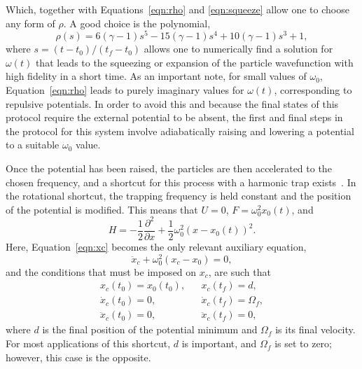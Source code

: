 \noindent \noindent Which, together with Equations~\eqref{eqn:rho} and \eqref{eqn:squeeze} allow one to choose any form of $\rho$.
A good choice is the polynomial,
\begin{equation}
 \rho (s) = 6 \left(\gamma -1\right) s^5 -15 \left(\gamma-1\right) s^4 +10 \left(\gamma-1\right)s^3 + 1, \label{eq:rho_pol}
\end{equation}
\noindent where $s=(t-t_0)/(t_f-t_0)$ allows one to numerically find a solution for $\omega(t)$ that leads to the squeezing or expansion of the particle wavefunction with high fidelity in a short time.
As an important note, for small values of $\omega_0$, Equation~\eqref{eqn:rho} leads to purely imaginary values for $\omega(t)$, corresponding to repulsive potentials.
In order to avoid this and because the final states of this protocol require the external potential to be absent, the first and final steps in the protocol for this system involve adiabatically raising and lowering a potential to a suitable $\omega_0$ value. 

Once the potential has been raised, the particles are then accelerated to the chosen frequency, and a shortcut for this process with a harmonic trap exists~\cite{masuda2009,torrontegui2011,masuda2012}.
In the rotational shortcut, the trapping frequency is held constant and the position of the potential is modified.
This means that $U=0$, $F=\omega_0^2 x_0(t)$, and
\begin{equation}
 H= -\frac{1}{2} \frac{\partial^2}{\partial x}+ \frac 1 2 \omega^2_0 (x-x_0(t))^2.
\end{equation}
\noindent Here, Equation~\eqref{eqn:xc} becomes the only relevant auxiliary equation,
\begin{equation}
 \ddot{x}_c+\omega^2_0 (x_c-x_0)=0,
\end{equation}
and the conditions that must be imposed on $x_c$, are such that
\begin{equation}
 \begin{array}{lcl}
x_c(t_0)=x_0(t_0), && x_c(t_f)=d,\\
\dot x_c(t_0)=0, && \dot x_c(t_f) =\Omega_f, \\
\ddot x_c(t_0)=0, && \ddot x_c(t_f)=0,
\end{array}
\end{equation}
\noindent where $d$ is the final position of the potential minimum and $\Omega_f$ is its final velocity. 
For most applications of this shortcut, $d$ is important, and $\Omega_f$ is set to zero; however, this case is the opposite.


